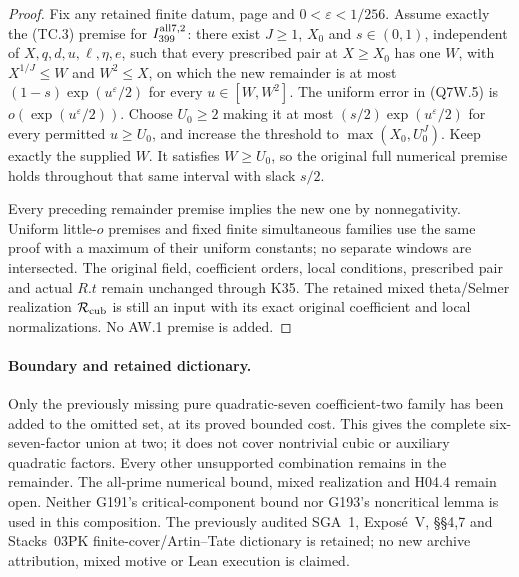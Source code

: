 \begin{proof}
Fix any retained finite datum, page and $0<\varepsilon<1/256$.
Assume exactly the (TC.3) premise for $I_{399}^{\rm all7,2}$:
there exist $J\geq1$, $X_0$ and $s\in(0,1)$, independent of
$X,q,d,u,\ell,\eta,e$, such that every prescribed pair at
$X\geq X_0$ has one $W$, with $X^{1/J}\leq W$ and $W^2\leq X$,
on which the new remainder is at most
$(1-s)\exp(u^\varepsilon/2)$ for every $u\in[W,W^2]$.
The uniform error in (Q7W.5) is
$o(\exp(u^\varepsilon/2))$.
Choose $U_0\geq2$ making it at most
$(s/2)\exp(u^\varepsilon/2)$ for every permitted $u\geq U_0$,
and increase the threshold to $\max(X_0,U_0^J)$.
Keep exactly the supplied $W$.
It satisfies $W\geq U_0$, so the original full numerical premise
holds throughout that same interval with slack $s/2$.

Every preceding remainder premise implies the new one by
nonnegativity.  Uniform little-$o$ premises and fixed finite
simultaneous families use the same proof with a maximum of
their uniform constants; no separate windows are intersected.
The original field, coefficient orders, local conditions,
prescribed pair and actual $R.t$ remain unchanged through K35.
The retained mixed theta/Selmer realization
$\mathcal R_{\rm cub}$ is still an input with its exact original
coefficient and local normalizations.  No AW.1 premise is added.
\end{proof}

\paragraph{Boundary and retained dictionary.}
Only the previously missing pure quadratic-seven coefficient-two
family has been added to the omitted set, at its proved bounded
cost.  This gives the complete six-seven-factor union at two;
it does not cover nontrivial cubic or auxiliary quadratic factors.
Every other unsupported combination remains in the remainder.
The all-prime numerical bound, mixed realization and H04.4
remain open.  Neither G191's critical-component bound nor
G193's noncritical lemma is used in this composition.
The previously audited SGA~1, Expos\'e~V, \S\S4,7 and Stacks~03PK
finite-cover/Artin--Tate dictionary is retained; no new archive
attribution, mixed motive or Lean execution is claimed.
